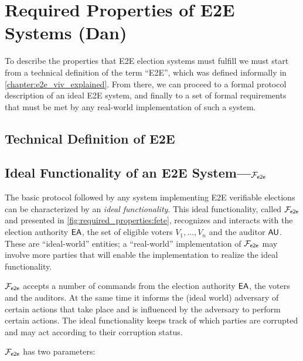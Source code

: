 \chapter{Required Properties of E2E Systems (Dan)}
\label{chapter:required_properties}

To describe the properties that E2E election systems must fulfill we
must start from a technical definition of the term ``E2E'', which was
defined informally in \autoref{chapter:e2e_viv_explained}. From there,
we can proceed to a formal protocol description of an ideal E2E
system, and finally to a set of formal requirements that must be met
by any real-world implementation of such a system.

\section{Technical Definition of E2E}

\section{Ideal Functionality of an E2E System---$\mathcal{F}_{\mathsf{e2e}}$}
The basic protocol followed by any system implementing E2E verifiable
elections can be characterized by an \emph{ideal functionality}. This
ideal functionality, called $\mathcal{F}_{\mathsf{e2e}}$ and presented in
\autoref{fig:required_properties:fete}, recognizes and interacts with
the election authority $\mathsf{EA}$, the set of eligible voters
$V_1,\ldots, V_n$ and the auditor $\mathsf{AU}$.  These are ``ideal-world''
entities; a ``real-world'' implementation of $\mathcal{F}_{\mathsf{e2e}}$ may involve more
parties that will enable the implementation to realize the ideal
functionality.

$\mathcal{F}_{\mathsf{e2e}}$ accepts a number of commands from the election authority
$\mathsf{EA}$, the voters and the auditors. At the same time it informs the
(ideal world) adversary of certain actions that take place and is
influenced by the adversary to perform certain actions. The ideal
functionality keeps track of which parties are corrupted and may act
according to their corruption status.

$\mathcal{F}_{\mathsf{e2e}}$ has two parameters:

